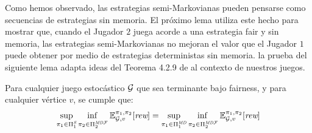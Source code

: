 %	
%	



Como hemos observado, las estrategias semi-Markovianas pueden pensarse como secuencias de estrategias sin memoria. El próximo lema utiliza este hecho para mostrar que, cuando el Jugador $2$ juega acorde a una estrategia fair y sin memoria,  las estrategias semi-Markovianas no mejoran el valor que el Jugador $1$ puede obtener por medio de estrategias deterministas sin memoria. la prueba del siguiente lema adapta ideas del Teorema 4.2.9 de \cite{FilarV96} al contexto de nuestros juegos.%

\begin{lemma}\label{lm:semimarkov-to-detmemoryless} Para cualquier juego estocástico $\mathcal{G}$  que sea terminante bajo fairness, y para cualquier vértice $v$, se cumple que:
\[\adjustlimits
	\sup_{\strat{1} \in \SemiMarkovStrats{1}} \inf_{\strat{2} \in \DetMemorylessFairStrats{2}} \Expect{\strat{1}}{\strat{2}}_{\StochG,v}[\Rewards]
	= \adjustlimits
	\sup_{\strat{1} \in \DetMemorylessStrats{1}} \inf_{\strat{2} \in \DetMemorylessFairStrats{2}} \Expect{\strat{1}}{\strat{2}}_{\StochG,v}[\Rewards]
\]
\end{lemma}

